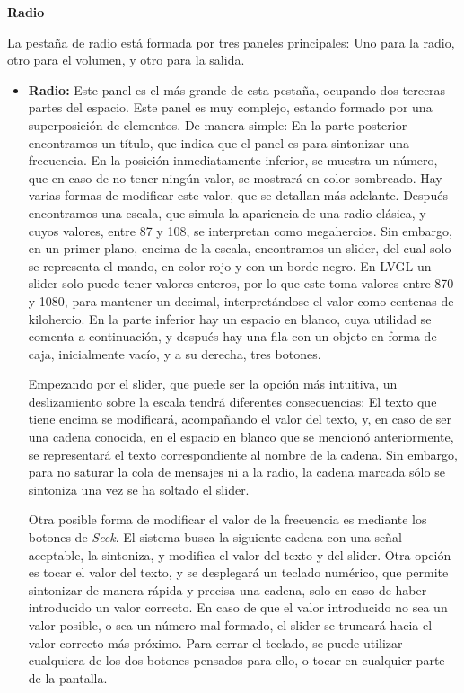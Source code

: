 \textbf{Radio}

La pestaña de radio está formada por tres paneles principales: Uno para la radio, otro para el volumen, y otro para la salida.

\begin{itemize}
    \item \textbf{Radio:} Este panel es el más grande de esta pestaña, ocupando dos terceras partes del espacio. Este panel es muy complejo, estando formado por una superposición de elementos. De manera simple: En la parte posterior encontramos un título, que indica que el panel es para sintonizar una frecuencia. En la posición inmediatamente inferior, se muestra un número, que en caso de no tener ningún valor, se mostrará en color sombreado. Hay varias formas de modificar este valor, que se detallan más adelante. Después encontramos una escala, que simula la apariencia de una radio clásica, y cuyos valores, entre 87 y 108, se interpretan como megahercios. Sin embargo, en un primer plano, encima de la escala, encontramos un slider, del cual solo se representa el mando, en color rojo y con un borde negro. En LVGL un slider solo puede tener valores enteros, por lo que este toma valores entre 870 y 1080, para mantener un decimal, interpretándose el valor como centenas de kilohercio. En la parte inferior hay un espacio en blanco, cuya utilidad se comenta a continuación, y después hay una fila con un objeto en forma de caja, inicialmente vacío, y a su derecha, tres botones.

    Empezando por el slider, que puede ser la opción más intuitiva, un deslizamiento sobre la escala tendrá diferentes consecuencias: El texto que tiene encima se modificará, acompañando el valor del texto, y, en caso de ser una cadena conocida, en el espacio en blanco que se mencionó anteriormente, se representará el texto correspondiente al nombre de la cadena. Sin embargo, para no saturar la cola de mensajes ni a la radio, la cadena marcada sólo se sintoniza una vez se ha soltado el slider.

    Otra posible forma de modificar el valor de la frecuencia es mediante los botones de \textit{Seek}. El sistema busca la siguiente cadena con una señal aceptable, la sintoniza, y modifica el valor del texto y del slider. Otra opción es tocar el valor del texto, y se desplegará un teclado numérico, que permite sintonizar de manera rápida y precisa una cadena, solo en caso de haber introducido un valor correcto. En caso de que el valor introducido no sea un valor posible, o sea un número mal formado, el slider se truncará hacia el valor correcto más próximo. Para cerrar el teclado, se puede utilizar cualquiera de los dos botones pensados para ello, o tocar en cualquier parte de la pantalla.


\end{itemize}
